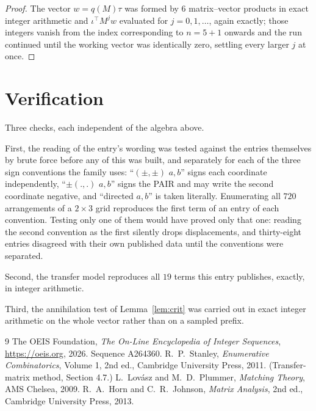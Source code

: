\documentclass[11pt,a4paper]{article}
\theoremstyle{plain}
\theoremstyle{definition}
\begin{document}
\begin{proof}
The vector $w=q(M)\tau$ was formed by $6$ matrix--vector products in exact integer
arithmetic and $\iota^{\!\top}M^{j}w$ evaluated for $j=0,1,\dots$, again exactly; those
integers vanish from the index corresponding to $n=5+1$ onwards and the run continued
until the working vector was identically zero, settling every larger $j$ at once.
\end{proof}

\section{Verification}

Three checks, each independent of the algebra above.

First, the reading of the entry's wording was tested against the entries themselves by brute
force before any of this was built, and separately for each of the three sign conventions the
family uses: ``$(\pm,\pm)$ $a,b$'' signs each coordinate independently, ``$\pm(.,.)$ $a,b$''
signs the PAIR and may write the second coordinate negative, and ``directed $a,b$'' is taken
literally. Enumerating all $720$ arrangements of a $2\times3$ grid reproduces the first term
of an entry of each convention. Testing only one of them would have proved only that one:
reading the second convention as the first silently drops displacements, and thirty-eight
entries disagreed with their own published data until the conventions were separated.

Second, the transfer model reproduces all $19$ terms this entry publishes, exactly, in
integer arithmetic.

Third, the annihilation test of Lemma~\ref{lem:crit} was carried out in exact integer
arithmetic on the whole vector rather than on a sampled prefix.

\begin{thebibliography}{9}
 The OEIS Foundation, \emph{The On-Line Encyclopedia of Integer
Sequences}, \url{https://oeis.org}, 2026. Sequence A264360.
 R.~P.~Stanley, \emph{Enumerative Combinatorics}, Volume 1, 2nd ed.,
Cambridge University Press, 2011. (Transfer-matrix method, Section 4.7.)
 L.~Lov\'asz and M.~D.~Plummer, \emph{Matching Theory}, AMS Chelsea, 2009.
 R.~A.~Horn and C.~R.~Johnson, \emph{Matrix Analysis}, 2nd ed., Cambridge
University Press, 2013.
\end{thebibliography}
\end{document}
